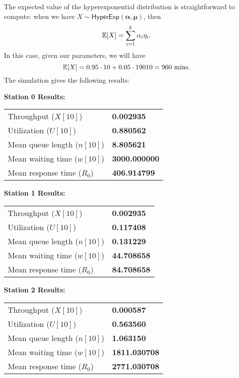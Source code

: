 \documentclass[12pt]{article}
\begin{document}
The expected value of the hyperexponential distribution is straightforward to compute: when we have $X\sim\mathsf{HyperExp}(\mathbf{\alpha},\mathbf{\mu})$, then
\begin{equation*}
	\mathbb{E}[X]=\sum_{i=1}^{k}\alpha_i\eta_i.
\end{equation*}
In this case, given our parameters, we will have
\begin{equation*}
	\mathbb{E}[X]=0.95\cdot 10+0.05\cdot19010=960\text{ mins}.
\end{equation*}
	The simulation gives the following results:
	
	\noindent\textbf{Station 0 Results:}
	\begin{table}[h!]
		\centering
		\begin{tabular}{@{}l l@{}}
			\toprule
			Throughput ($X[10]$)              & \textbf{0.002935} \\
			Utilization ($U[10]$)             & \textbf{0.880562} \\
			Mean queue length ($n[10]$)       & \textbf{8.805621} \\
			Mean waiting time ($w[10]$)       & \textbf{3000.000000} \\
			Mean response time ($R_0$)        & \textbf{406.914799} \\
			\bottomrule
		\end{tabular}
	\end{table}
	
	\noindent\textbf{Station 1 Results:}
	\begin{table}[h!]
		\centering
		\begin{tabular}{@{}l l@{}}
			\toprule
			Throughput ($X[10]$)              & \textbf{0.002935} \\
			Utilization ($U[10]$)             & \textbf{0.117408} \\
			Mean queue length ($n[10]$)       & \textbf{0.131229} \\
			Mean waiting time ($w[10]$)       & \textbf{44.708658} \\
			Mean response time ($R_0$)        & \textbf{84.708658} \\
			\bottomrule
		\end{tabular}
	\end{table}
	
	\noindent\textbf{Station 2 Results:}
	\begin{table}[h!]
		\centering
		\begin{tabular}{@{}l l@{}}
			\toprule
			Throughput ($X[10]$)              & \textbf{0.000587} \\
			Utilization ($U[10]$)             & \textbf{0.563560} \\
			Mean queue length ($n[10]$)       & \textbf{1.063150} \\
			Mean waiting time ($w[10]$)       & \textbf{1811.030708} \\
			Mean response time ($R_0$)        & \textbf{2771.030708} \\
			\bottomrule
		\end{tabular}
	\end{table}
	
\end{document}
